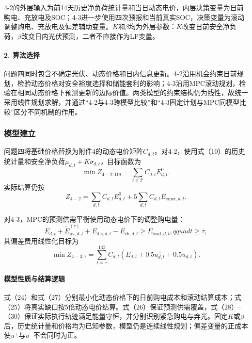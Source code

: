 \documentclass{cumcmthesis}
\newcommand{\Tset}{\mathcal{T}}
\begin{document}
4-2的外层输入为前14天历史净负荷统计量和当日动态电价，内层决策变量为日前购电、充放电及SOC；4-3进一步使用四次预报和当前真实SOC，决策变量为滚动调整购电、充放电及偏差辅助变量。$K$和$\beta$均为外层参数：$K$改变日前安全净负荷，$\beta$改变日内光伏预测，二者不直接作为LP变量。

\paragraph{2. 算法选择}

问题四同时包含不确定光伏、动态价格和日内信息更新。4-2沿用机会约束日前规划，检验动态价格对安全裕度选择和储能套利的影响；4-3沿用MPC滚动规划，检验在相同动态价格下预测更新的边际价值。两类模型的约束结构仍为线性，故统一采用线性规划求解，并通过“4-2与4-3跨模型比较”和“4-3固定计划与MPC同模型比较”区分不同机制的作用。

\subsubsection{模型建立}

问题四将基础价格替换为附件4的动态电价矩阵$C_{d,t}$。对4-2，使用式（10）的历史统计量和安全净负荷$\mu_{d,t}+K\sigma_{d,t}$，目标函数为
\begin{equation}
\min Z_{4-2,\mathrm{DA}}=\sum_{t\in\Tset}C_{d,t}E^0_{d,t}.
\tag{24}
\end{equation}
实际结算仍按
\begin{equation}
Z_{4-2}=\sum_{d,t}C_{d,t}E^0_{d,t}+5\sum_{d,t}C_{d,t}E_{\mathrm{emer},d,t}.
\tag{25}
\end{equation}

对4-3，MPC的预测供需平衡使用动态电价下的调整购电量：
\begin{equation}
E_{d,t}+\widetilde E_{\mathrm{pv},d,t}^{(\tau)}+E_{\mathrm{dis},d,t}-E_{\mathrm{ch},d,t}
\geq E_{\mathrm{load},d,t},qquad t\geq\tau,
\tag{26}
\end{equation}
其偏差费用线性化目标为
\begin{equation}
\min Z_{4-3,\tau}=\sum_{t=\tau}^{143}C_{d,t}
\left(E_{d,t}+0.5u^+_{d,t}+0.5u^-_{d,t}\right).
\tag{27}
\end{equation}
\paragraph{模型性质与结算逻辑}
式（24）和式（27）分别最小化动态价格下的日前购电成本和滚动结算成本；式（25）将真实缺口按5倍动态电价结算。式（26）保证预测供需覆盖，式（28）--（30）保证实际执行轨迹满足能量守恒，并分别识别紧急购电与弃光。固定$K$或$\beta$后，历史统计量和价格均为已知参数，模型仍是连续线性规划；偏差变量的正成本使$u^+$与$u^-$不会同时为正。
\end{document}
